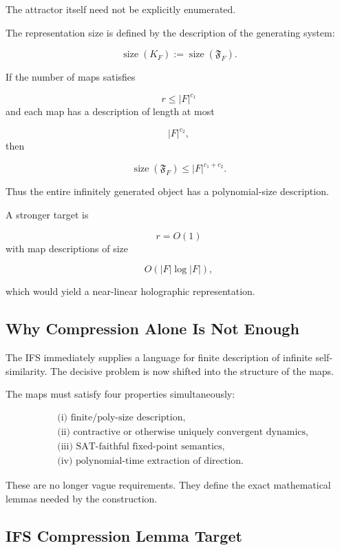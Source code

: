 \documentclass[11pt]{article}
\theoremstyle{plain}
\theoremstyle{definition}
\begin{document}
The attractor itself need not be explicitly enumerated.

The representation size is defined by the description of the generating
system:

\[
    \operatorname{size}(K_F)
    :=
    \operatorname{size}(\mathfrak{F}_F).
\]

If the number of maps satisfies

\[
    r\leq |F|^{c_1}
\]
and each map has a description of length at most

\[
    |F|^{c_2},
\]
then

\[
    \operatorname{size}(\mathfrak{F}_F)
    \leq
    |F|^{c_1+c_2}.
\]

Thus the entire infinitely generated object has a polynomial-size
description.

A stronger target is

\[
    r=O(1)
\]
with map descriptions of size

\[
    O(|F|\log |F|),
\]

which would yield a near-linear holographic representation.

\subsection{Why Compression Alone Is Not Enough}

The IFS immediately supplies a language for finite description of infinite
self-similarity.  The decisive problem is now shifted into the structure of
the maps.

The maps must satisfy four properties simultaneously:

\[
\boxed{
\begin{aligned}
&\text{(i) finite/poly-size description,}\\
&\text{(ii) contractive or otherwise uniquely convergent dynamics,}\\
&\text{(iii) SAT-faithful fixed-point semantics,}\\
&\text{(iv) polynomial-time extraction of direction.}
\end{aligned}
}
\]

These are no longer vague requirements.  They define the exact mathematical
lemmas needed by the construction.

\subsection{IFS Compression Lemma Target}
\end{document}
